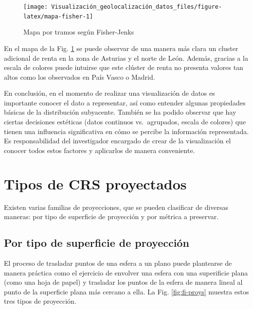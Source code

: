 \documentclass[
]{report}
\theoremstyle{definition}
\theoremstyle{definition}
\theoremstyle{definition}
\theoremstyle{definition}
\theoremstyle{remark}
\begin{document}
\begin{figure}

{\centering \texttt{[image: Visualización\_geolocalización\_datos\_files/figure-latex/mapa-fisher-1]} 

}

\caption{Mapa por tramos según Fisher-Jenks}\label{fig:mapa-fisher}
\end{figure}

En el mapa de la Fig. \ref{fig:mapa-fisher} se puede observar de una manera más
clara un cluster adicional de renta en la zona de Asturias y el norte de León.
Además, gracias a la escala de colores puede intuirse que este clúster de renta
no presenta valores tan altos como los observados en País Vasco o Madrid.

En conclusión, en el momento de realizar una visualización de datos es
importante conocer el dato a representar, así como entender algunas propiedades
básicas de la distribución subyacente. También se ha podido observar que hay
ciertas decisiones estéticas (datos continuos vs.~agrupados, escala de colores)
que tienen una influencia significativa en cómo se percibe la información
representada. Es responsabilidad del investigador encargado de crear de la
visualización el conocer todos estos factores y aplicarlos de manera
conveniente.

\hypertarget{appendix-anexo}{%
\appendix}


\hypertarget{crsproy}{%
\chapter{Tipos de CRS proyectados}\label{crsproy}}

Existen varias familias de proyecciones, que se pueden clasificar de diversas
maneras: por tipo de superficie de proyección y por métrica a preservar.

\hypertarget{por-tipo-de-superficie-de-proyecciuxf3n}{%
\section{Por tipo de superficie de proyección}\label{por-tipo-de-superficie-de-proyecciuxf3n}}

El proceso de trasladar puntos de una esfera a un plano puede plantearse de
manera práctica como el ejercicio de envolver una esfera con una superificie
plana (como una hoja de papel) y trasladar los puntos de la esfera de manera
lineal al punto de la superficie plana más cercano a ella. La Fig.
\ref{fig:fi-proys} muestra estos tres tipos de proyección.
\end{document}
